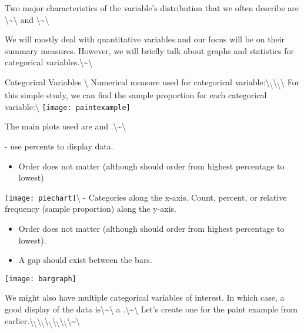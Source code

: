 \documentclass[]{book}
\begin{document}
Two major characteristics of the variable's distribution that we often
describe are
\underbar{~~~~~~~~~~~~~~~~~~~~~~~~~~~~~~~~~~~~}\textbackslash{}\textasciitilde{}\textbackslash{}
and
\underbar{~~~~~~~~~~~~~~~~~~~~~~~~~~~~~~~~~~~~}\textbackslash{}\textasciitilde{}\textbackslash{}

We will mostly deal with quantitative variables and our focus will be on
their summary measures. However, we will briefly talk about graphs and
statistics for categorical
variables.\textbackslash{}\textasciitilde{}\textbackslash{}

\huge Categorical Variables \normalsize\textbackslash{} Numerical
measure used for categorical
variable:\textbackslash{}\textsubscript{\textbackslash{}}\textbackslash{}\textsubscript{\textbackslash{}}\textbackslash{}
For this simple study, we can find the sample proportion for each
categorical variable:\textbackslash{}
\texttt{[image: paintexample]}

\newpage

The main plots used are \underbar{~~~~~~~~~~~~~~~~~~~~~~~~~~~~~~~~~~~~}
and
\underbar{~~~~~~~~~~~~~~~~~~~~~~~~~~~~~~~~~~~~}.\textbackslash{}\textasciitilde{}\textbackslash{}

\underbar{~~~~~~~~~~~~~~~~~~~~~~~~~~~~~~~~~~~~} - use percents to
display data.

\begin{itemize}
\item Order does not matter (although should order from highest percentage to lowest)
\end{itemize}

\texttt{[image: piechart]}\textbackslash{}
\underbar{~~~~~~~~~~~~~~~~~~~~~~~~~~~~~~~~~~~~} - Categories along the
x-axis. Count, percent, or relative frequency (sample proportion) along
the y-axis.\\

\begin{itemize}
\item Order does not matter (although should order from highest percentage to lowest).  
\item A gap should exist between the bars.
\end{itemize}

\texttt{[image: bargraph]}

\newpage

We might also have multiple categorical variables of interest. In which
case, a good display of the data
is\textbackslash{}\textasciitilde{}\textbackslash{} a
\underbar{~~~~~~~~~~~~~~~~~~~~~~~~~~~~~~~~~~~~~~~~~~~~~~~~~~~~~}.\textbackslash{}\textasciitilde{}\textbackslash{}
Let's create one for the paint example from
earlier.\textbackslash{}\textsubscript{\textbackslash{}}\textbackslash{}\textsubscript{\textbackslash{}}\textbackslash{}\textsubscript{\textbackslash{}}\textbackslash{}\textsubscript{\textbackslash{}}\textbackslash{}\textsubscript{\textbackslash{}}\textbackslash{}\textasciitilde{}\textbackslash{}
\end{document}
